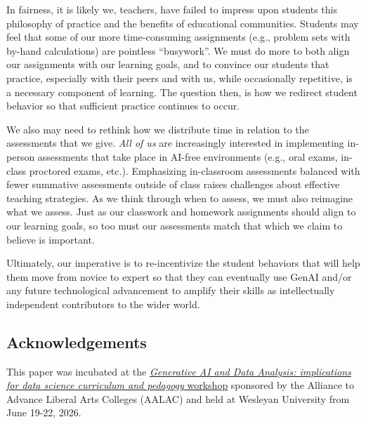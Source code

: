 \documentclass[
]{hdsr}
\begin{document}
In fairness, it is likely we, teachers, have failed to impress upon
students this philosophy of practice and the benefits of educational
communities. Students may feel that some of our more time-consuming
assignments (e.g., problem sets with by-hand calculations) are pointless
``busywork''. We must do more to both align our assignments with our
learning goals, and to convince our students that practice, especially
with their peers and with us, while occasionally repetitive, is a
necessary component of learning. The question then, is how we redirect
student behavior so that sufficient practice continues to occur.

We also may need to rethink how we distribute time in relation to the
assessments that we give. \emph{All of us} are increasingly interested
in implementing in-person assessments that take place in AI-free
environments (e.g., oral exams, in-class proctored exams, etc.).
Emphasizing in-classroom assessments balanced with fewer summative
assessments outside of class raises challenges about effective teaching
strategies. As we think through when to assess, we must also reimagine
what we assess. Just as our classwork and homework assignments should
align to our learning goals, so too must our assessments match that
which we claim to believe is important.

Ultimately, our imperative is to re-incentivize the student behaviors
that will help them move from novice to expert so that they can
eventually use GenAI and/or any future technological advancement to
amplify their skills as intellectually independent contributors to the
wider world.

\subsection{Acknowledgements}\label{sec-workshop}

This paper was incubated at the
\href{https://beanumber.github.io/aalac2026/}{\emph{Generative AI and
Data Analysis: implications for data science curriculum and pedagogy}
workshop} sponsored by the Alliance to Advance Liberal Arts Colleges
(AALAC) and held at Wesleyan University from June 19-22, 2026.
\end{document}
